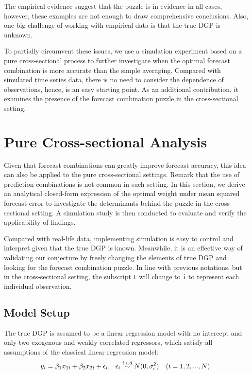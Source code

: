 \documentclass{monashthesis}
\begin{document}
The empirical evidence suggest that the puzzle is in evidence in all cases, however, these examples are not enough to draw comprehensive conclusions. Also, one big challenge of working with empirical data is that the true DGP is unknown.

To partially circumvent these issues, we use a simulation experiment based on a pure cross-sectional process to further investigate when the optimal forecast combination is more accurate than the simple averaging. Compared with simulated time series data, there is no need to consider the dependence of observations, hence, is an easy starting point. As an additional contribution, it examines the presence of the forecast combination puzzle in the cross-sectional setting.

\hypertarget{pure-cross-sectional-analysis}{%
\chapter{Pure Cross-sectional Analysis}\label{pure-cross-sectional-analysis}}

Given that forecast combinations can greatly improve forecast accuracy, this idea can also be applied to the pure cross-sectional settings. Remark that the use of prediction combinations is not common in such setting. In this section, we derive an analytical closed-form expression of the optimal weight under mean squared forecast error to investigate the determinants behind the puzzle in the cross-sectional setting. A simulation study is then conducted to evaluate and verify the applicability of findings.

Compared with real-life data, implementing simulation is easy to control and interpret given that the true DGP is known. Meanwhile, it is an effective way of validating our conjecture by freely changing the elements of true DGP and looking for the forecast combination puzzle. In line with previous notations, but in the cross-sectional setting, the subscript \texttt{t} will change to \texttt{i} to represent each individual observation.

\hypertarget{model-setup}{%
\section{Model Setup}\label{model-setup}}

The true DGP is assumed to be a linear regression model with no intercept and only two exogenous and weakly correlated regressors, which satisfy all assumptions of the classical linear regression model:
\begin{equation}
\label{eqn:DGP}
y_i = \beta_1 x_{1i} + \beta_2 x_{2i} + \epsilon_i, \ \ \epsilon_i \stackrel{i.i.d}{\sim} N(0,\sigma^2_{\epsilon}) \ \ \ (i = 1,2,...,N). \\
\end{equation}
\end{document}
